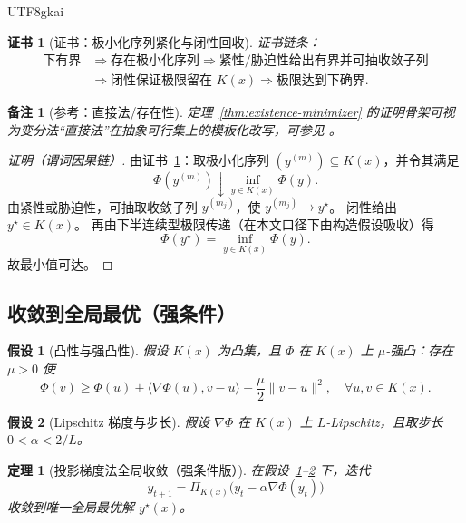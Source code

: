 \documentclass[12pt]{article}
\newtheorem{assumption}{假设}[section]
\newtheorem{theorem}{定理}[section]
\newtheorem{remark}{备注}[section]
\newtheorem{Certificate}{证书}[section]
\begin{document}
\begin{CJK*}{UTF8}{gkai}
\begin{Certificate}[证书：极小化序列紧化与闭性回收]\label{cert:existence-minimizer}
证书链条：
\[
\begin{aligned}
\text{下有界}
&\Rightarrow \text{存在极小化序列}
\Rightarrow \text{紧性/胁迫性给出有界并可抽收敛子列}\\
&\Rightarrow \text{闭性保证极限留在 }K(x)
\Rightarrow \text{极限达到下确界}.
\end{aligned}
\]
\end{Certificate}

\begin{remark}[参考：直接法/存在性]
定理~\ref{thm:existence-minimizer} 的证明骨架可视为变分法“直接法”在抽象可行集上的模板化改写，可参见 \cite{Dacorogna2008}。
\end{remark}

\begin{proof}[证明（谓词因果链）]
由证书~\ref{cert:existence-minimizer}：取极小化序列 $(y^{(m)})\subseteq K(x)$，并令其满足
\[
\Phi(y^{(m)})\downarrow\inf_{y\in K(x)}\Phi(y).
\]
由紧性或胁迫性，可抽取收敛子列 $y^{(m_j)}$，使 $y^{(m_j)}\to y^\star$。
闭性给出 $y^\star\in K(x)$。
再由下半连续型极限传递（在本文口径下由构造假设吸收）得
\[
\Phi(y^\star)=\inf_{y\in K(x)}\Phi(y).
\]
故最小值可达。
\end{proof}

\subsection{收敛到全局最优（强条件）}

\begin{assumption}[凸性与强凸性]\label{ass:strong-convex}
假设 $K(x)$ 为凸集，且 $\Phi$ 在 $K(x)$ 上 $\mu$-强凸：存在 $\mu>0$ 使
\[
\Phi(v)\ge \Phi(u)+\langle\nabla\Phi(u),v-u\rangle+\frac{\mu}{2}\|v-u\|^2,
\quad \forall u,v\in K(x).
\]
\end{assumption}

\begin{assumption}[Lipschitz 梯度与步长]\label{ass:lipschitz-step}
假设 $\nabla\Phi$ 在 $K(x)$ 上 $L$-Lipschitz，且取步长 $0<\alpha<2/L$。
\end{assumption}

\begin{theorem}[投影梯度法全局收敛（强条件版）]\label{thm:pgd-global}
在假设~\ref{ass:strong-convex}--\ref{ass:lipschitz-step} 下，迭代
\[
y_{t+1}=\Pi_{K(x)}\bigl(y_t-\alpha\nabla\Phi(y_t)\bigr)
\]
收敛到唯一全局最优解 $y^\star(x)$。
\end{theorem}


\end{CJK*}
\end{document}
